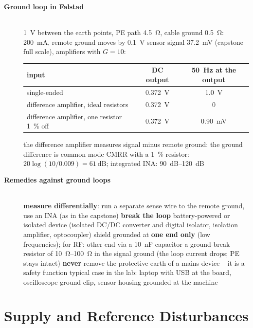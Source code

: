 \begin{description}
\item[{\rot\bf Ground loop in Falstad}]~\\[-\lblskip]
\bi
	\ite \SI{1}{\volt} between the earth points, PE path \SI{4.5}{\ohm}, cable ground \SI{0.5}{\ohm}: \SI{200}{\milli\ampere}, remote ground moves by \SI{0.1}{\volt}
	\ite sensor signal \SI{37.2}{\milli\volt} (capstone full scale), amplifiers with $G = 10$:
\ei
\begin{center}
\begin{tabular}{lcc}
\toprule
input & DC output & \SI{50}{\hertz} at the output \\
\midrule
single-ended & \SI{0.372}{\volt} & \SI{1.0}{\volt} \\
difference amplifier, ideal resistors & \SI{0.372}{\volt} & 0 \\
difference amplifier, one resistor \SI{1}{\percent} off & \SI{0.372}{\volt} & \SI{0.90}{\milli\volt} \\
\bottomrule
\end{tabular}
\end{center}
\par
\bi
	\ite the difference amplifier measures signal minus remote ground: the ground difference is common mode
	\ite CMRR with a \SI{1}{\percent} resistor: $20\log(10/0.009) = \SI{61}{\deci\bel}$; integrated INA: \SIrange{90}{120}{\deci\bel}
\ei
\os{\newpage}

\item[{\rot\bf Remedies against ground loops}]~\\[-\lblskip]
\bi
	\ite \textbf{measure differentially}: run a separate sense wire to the remote ground, use an INA (as in the capstone)
	\ite \textbf{break the loop}
	\itee battery-powered or isolated device (isolated DC/DC converter and digital isolator, isolation amplifier, optocoupler)
	\itee shield grounded at \textbf{one end only} (low frequencies); for RF: other end via a \SI{10}{\nano\farad} capacitor
	\itee a ground-break resistor of \SIrange{10}{100}{\ohm} in the signal ground (the loop current drops; PE stays intact)
	\ite \textbf{never} remove the protective earth of a mains device -- it is a safety function
	\ite typical case in the lab: laptop with USB at the board, oscilloscope ground clip, sensor housing grounded at the machine
\ei
\os{\newpage}
\end{description}

\section{Supply and Reference Disturbances}

